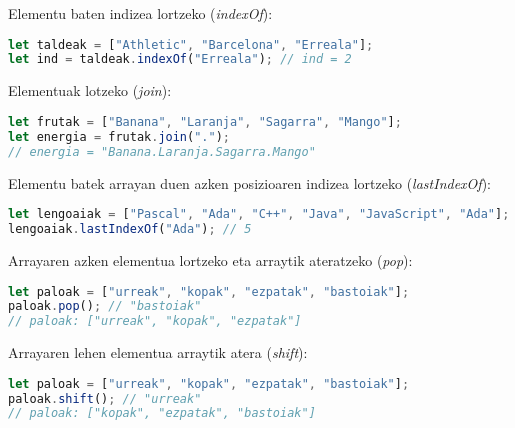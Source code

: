  Elementu baten indizea lortzeko (\textit{indexOf}):

\begin{minipage}{\linewidth}
\begin{lstlisting}[language=JavaScript]
let taldeak = ["Athletic", "Barcelona", "Erreala"];
let ind = taldeak.indexOf("Erreala"); // ind = 2
\end{lstlisting}
\end{minipage}

 Elementuak lotzeko (\textit{join}):

\begin{minipage}{\linewidth}
\begin{lstlisting}[language=JavaScript]
let frutak = ["Banana", "Laranja", "Sagarra", "Mango"];
let energia = frutak.join(".");
// energia = "Banana.Laranja.Sagarra.Mango"
\end{lstlisting}
\end{minipage}

 Elementu batek arrayan duen azken posizioaren indizea lortzeko (\textit{lastIndexOf}):

\begin{minipage}{\linewidth}
\begin{lstlisting}[language=JavaScript]
let lengoaiak = ["Pascal", "Ada", "C++", "Java", "JavaScript", "Ada"];
lengoaiak.lastIndexOf("Ada"); // 5
\end{lstlisting}
\end{minipage}

 Arrayaren azken elementua lortzeko eta arraytik ateratzeko (\textit{pop}):

\begin{minipage}{\linewidth}
\begin{lstlisting}[language=JavaScript]
let paloak = ["urreak", "kopak", "ezpatak", "bastoiak"];
paloak.pop(); // "bastoiak"
// paloak: ["urreak", "kopak", "ezpatak"]
\end{lstlisting}
\end{minipage}

 Arrayaren lehen elementua arraytik atera (\textit{shift}):

\begin{minipage}{\linewidth}
\begin{lstlisting}[language=JavaScript]
let paloak = ["urreak", "kopak", "ezpatak", "bastoiak"];
paloak.shift(); // "urreak"
// paloak: ["kopak", "ezpatak", "bastoiak"]
\end{lstlisting}
\end{minipage}


